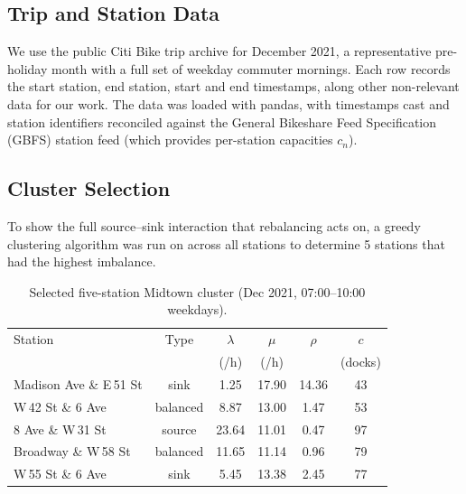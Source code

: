 \documentclass[conference]{IEEEtran}
\begin{document}
\subsection{Trip and Station Data}

We use the public Citi Bike trip archive \cite{citibike_data} for December 2021, a representative pre-holiday month with a full set of weekday commuter mornings. Each row records the start station, end station, start and end timestamps, along other non-relevant data for our work. The data was loaded with pandas, with timestamps cast and station identifiers reconciled against the General Bikeshare Feed Specification (GBFS) station feed \cite{gbfs} (which provides per-station capacities $c_n$).

\subsection{Cluster Selection}

To show the full source--sink interaction that rebalancing acts on, a greedy clustering algorithm was run on across all stations to determine 5 stations that had the highest imbalance\cite{virtanen2020}.

\begin{table}[t]
\caption{Selected five-station Midtown cluster (Dec 2021, 07{:}00--10{:}00 weekdays).}
\label{tab:cluster}
\centering
\renewcommand{\arraystretch}{1.1}
\setlength{\tabcolsep}{4pt}
\begin{tabular}{@{}lccccc@{}}
\toprule
Station & Type & $\lambda$ & $\mu$ & $\rho$ & $c$ \\
& & (/h) & (/h) & & (docks) \\
\midrule
Madison Ave \& E\,51 St & sink     & 1.25  & 17.90 & 14.36 & 43 \\
W\,42 St \& 6 Ave        & balanced & 8.87  & 13.00 & 1.47  & 53 \\
8 Ave \& W\,31 St        & source   & 23.64 & 11.01 & 0.47  & 97 \\
Broadway \& W\,58 St     & balanced & 11.65 & 11.14 & 0.96  & 79 \\
W\,55 St \& 6 Ave        & sink     & 5.45  & 13.38 & 2.45  & 77 \\
\bottomrule
\end{tabular}
\end{table}


\end{document}
